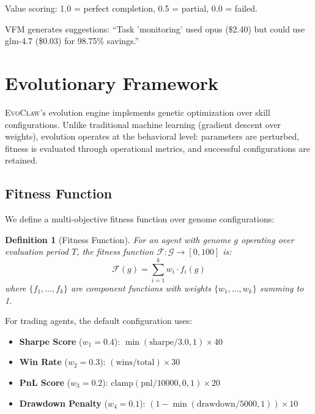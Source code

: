 \documentclass{article}
\newtheorem{definition}{Definition}
\newcommand{\evoclaw}{\textsc{EvoClaw}}
\newcommand{\fitnessfn}{\mathcal{F}}
\newcommand{\genomespace}{\mathcal{G}}
\begin{document}
Value scoring: 1.0 = perfect completion, 0.5 = partial, 0.0 = failed.

VFM generates suggestions: ``Task 'monitoring' used opus (\$2.40) but could use glm-4.7 (\$0.03) for 98.75\% savings.''



\section{Evolutionary Framework}
\label{sec:evolution}

\evoclaw{}'s evolution engine implements genetic optimization over skill configurations. Unlike traditional machine learning (gradient descent over weights), evolution operates at the behavioral level: parameters are perturbed, fitness is evaluated through operational metrics, and successful configurations are retained.

\subsection{Fitness Function}

We define a multi-objective fitness function over genome configurations:

\begin{definition}[Fitness Function]
For an agent with genome $g$ operating over evaluation period $T$, the fitness function $\fitnessfn: \genomespace \to [0, 100]$ is:
\begin{equation}
\fitnessfn(g) = \sum_{i=1}^{k} w_i \cdot f_i(g)
\end{equation}
where $\{f_1, \ldots, f_k\}$ are component functions with weights $\{w_1, \ldots, w_k\}$ summing to 1.
\end{definition}

For trading agents, the default configuration uses:

\begin{itemize}[leftmargin=*]
    \item \textbf{Sharpe Score} ($w_1 = 0.4$): $\min(\text{sharpe}/3.0, 1) \times 40$
    \item \textbf{Win Rate} ($w_2 = 0.3$): $(\text{wins}/\text{total}) \times 30$
    \item \textbf{PnL Score} ($w_3 = 0.2$): $\text{clamp}(\text{pnl}/10000, 0, 1) \times 20$
    \item \textbf{Drawdown Penalty} ($w_4 = 0.1$): $(1 - \min(\text{drawdown}/5000, 1)) \times 10$
\end{itemize}
\end{document}
